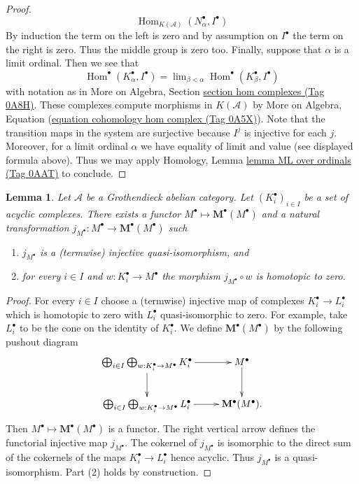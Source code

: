 \documentclass{amsart}
\theoremstyle{plain}
\newtheorem{lemma}[subsection]{Lemma}
\theoremstyle{definition}
\theoremstyle{remark}
\numberwithin{equation}{subsection}
\def\lim{\mathop{\mathrm{lim}}\nolimits}
\def\Hom{\mathop{\mathrm{Hom}}\nolimits}
\begin{document}
\begin{proof}
$$\Hom_{K(\mathcal{A})}(N_\alpha^\bullet, I^\bullet)
$$
By induction the term on the left is zero and by assumption on $I^\bullet$
the term on the right is zero. Thus the middle group is zero too.
Finally, suppose that $\alpha$ is a limit ordinal. Then we see that
$$
\Hom^\bullet(K_\alpha^\bullet, I^\bullet) =
\lim_{\beta < \alpha} \Hom^\bullet(K_\beta^\bullet, I^\bullet)
$$
with notation as in
More on Algebra, Section \href{https://stacks.math.columbia.edu/tag/0A8H}{section hom complexes (Tag 0A8H)}.
These complexes compute morphisms in $K(\mathcal{A})$ by
More on Algebra, Equation
(\href{https://stacks.math.columbia.edu/tag/0A5X}{equation cohomology hom complex (Tag 0A5X)}).
Note that the transition maps in the system are surjective
because $I^j$ is injective for each $j$. Moreover, for a limit
ordinal $\alpha$ we have equality of limit and value
(see displayed formula above). Thus we may apply
Homology, Lemma \href{https://stacks.math.columbia.edu/tag/0AAT}{lemma ML over ordinals (Tag 0AAT)}
to conclude.
\end{proof}


\begin{lemma}
\label{lemma-functorial-homotopies}
Let $\mathcal{A}$ be a Grothendieck abelian category.
Let $(K_i^\bullet)_{i \in I}$ be a set of acyclic complexes.
There exists a functor $M^\bullet \mapsto \mathbf{M}^\bullet(M^\bullet)$
and a natural transformation
$j_{M^\bullet} : M^\bullet \to \mathbf{M}^\bullet(M^\bullet)$
such
\begin{enumerate}
\item $j_{M^\bullet}$ is a (termwise) injective quasi-isomorphism, and
\item for every $i \in I$ and $w : K_i^\bullet \to M^\bullet$
the morphism $j_{M^\bullet} \circ w$ is homotopic to zero.
\end{enumerate}
\end{lemma}

\begin{proof}
For every $i \in I$ choose a (termwise) injective map of complexes
$K_i^\bullet \to L_i^\bullet$ which is homotopic to zero with
$L_i^\bullet$ quasi-isomorphic to zero. For example, take $L_i^\bullet$
to be the cone on the identity of $K_i^\bullet$.
We define $\mathbf{M}^\bullet(M^\bullet)$ by the following pushout diagram
$$
\xymatrix{
\bigoplus_{i \in I}
\bigoplus_{w : K_i^\bullet \to M^\bullet}
K_i^\bullet \ar[r] \ar[d] & M^\bullet \ar[d] \\
\bigoplus_{i \in I}
\bigoplus_{w : K_i^\bullet \to M^\bullet}
L_i^\bullet \ar[r] &  \mathbf{M}^\bullet(M^\bullet).
}
$$
Then $M^\bullet \mapsto \mathbf{M}^\bullet(M^\bullet)$ is a functor. The right
vertical arrow defines the functorial injective map $j_{M^\bullet}$.
The cokernel of $j_{M^\bullet}$ is isomorphic to the direct sum of
the cokernels of the maps $K_i^\bullet \to L_i^\bullet$ hence acyclic.
Thus $j_{M^\bullet}$ is a quasi-isomorphism. Part (2) holds by construction.
\end{proof}
\end{document}
